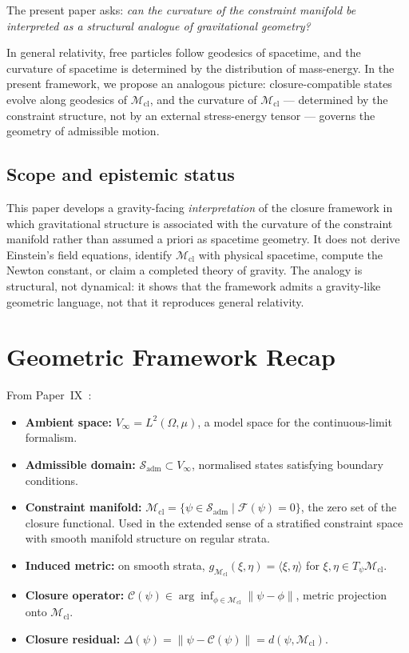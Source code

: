 \documentclass[12pt]{article}
\newcommand{\Mcl}{\mathcal{M}_{\mathrm{cl}}}
\newcommand{\Ccal}{\mathcal{C}}
\newcommand{\Fcal}{\mathcal{F}}
\newcommand{\Sadm}{\mathcal{S}_{\mathrm{adm}}}
\begin{document}
The present paper asks: \textit{can the curvature of the constraint manifold be interpreted as a structural analogue of gravitational geometry?}

In general relativity, free particles follow geodesics of spacetime, and the curvature of spacetime is determined by the distribution of mass-energy. In the present framework, we propose an analogous picture: closure-compatible states evolve along geodesics of $\Mcl$, and the curvature of $\Mcl$ --- determined by the constraint structure, not by an external stress-energy tensor --- governs the geometry of admissible motion.

\subsection*{Scope and epistemic status}

This paper develops a gravity-facing \textit{interpretation} of the closure framework in which gravitational structure is associated with the curvature of the constraint manifold rather than assumed a priori as spacetime geometry. It does not derive Einstein's field equations, identify $\Mcl$ with physical spacetime, compute the Newton constant, or claim a completed theory of gravity. The analogy is structural, not dynamical: it shows that the framework admits a gravity-like geometric language, not that it reproduces general relativity.

\section{Geometric Framework Recap}\label{sec:recap}

From Paper~IX~\citep{SmartIX}:

\begin{itemize}
    \item \textbf{Ambient space:} $V_\infty = L^2(\Omega, \mu)$, a model space for the continuous-limit formalism.
    \item \textbf{Admissible domain:} $\Sadm \subset V_\infty$, normalised states satisfying boundary conditions.
    \item \textbf{Constraint manifold:} $\Mcl = \{\psi \in \Sadm \mid \Fcal(\psi) = 0\}$, the zero set of the closure functional. Used in the extended sense of a stratified constraint space with smooth manifold structure on regular strata.
    \item \textbf{Induced metric:} on smooth strata, $g_{\Mcl}(\xi, \eta) = \langle\xi, \eta\rangle$ for $\xi, \eta \in T_\psi \Mcl$.
    \item \textbf{Closure operator:} $\Ccal(\psi) \in \arg\inf_{\phi \in \Mcl} \|\psi - \phi\|$, metric projection onto $\Mcl$.
    \item \textbf{Closure residual:} $\Delta(\psi) = \|\psi - \Ccal(\psi)\| = d(\psi, \Mcl)$.
\end{itemize}
\end{document}
